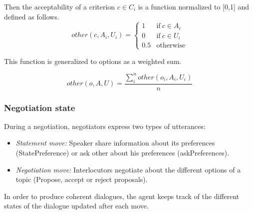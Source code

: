 \documentclass{llncs}
\begin{document}
	Then the acceptability of a criterion $c \in C_i$ is a function normalized to [0,1] and defined as follows.
	\begin{equation}
	other(c, A_i, U_i)= \left\{\begin{array}{ll}
	1	 & \mathrm{if\ }  c \in A_i\\
	0    & \mathrm{if\ }c \in U_i\\
	0.5	 & \mathrm{otherwise}
	\end{array}\right.
	\end{equation}
	
	
	This function is generalized to options as a weighted sum.
	
	\begin{equation}
	other(o, A, U) = \frac{ \sum_{i}^{n} other(o_i, A_i, U_i) } {n}
	\end{equation}
	
	
	\subsubsection{Negotiation state}
	During a negotiation, negotiators express two types of utterances: %
	
	\begin{itemize} [noitemsep]
	\item \emph{Statement move:} Speaker share information about its preferences (StatePreference) or ask other about his preferences (askPreferences).
	\item \emph{Negotiation move:} Interlocutors negotiate about the different options of a topic (Propose, accept or reject proposals).
	\end{itemize}
	
	
	In order to produce coherent dialogues, the agent keeps track of the different states of the dialogue updated after each move. 
	
\end{document}
